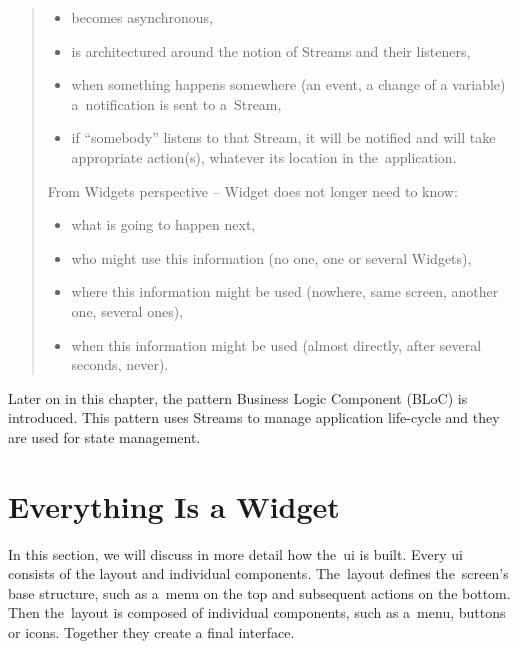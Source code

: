 \begin{quote}
    \begin{itemize}
        \item becomes asynchronous,
        \item is architectured around the notion of Streams and their listeners,
        \item when something happens somewhere (an event, a change of a variable) a~notification is sent to a~Stream,
        \item if ``somebody'' listens to that Stream, it will be notified and will take appropriate action(s), whatever its location in the~application.
    \end{itemize}
    
    From Widgets perspective -- Widget does not longer need to know:
    
    \begin{itemize}
        \item what is going to happen next,
        \item who might use this information (no one, one or several Widgets),
        \item where this information might be used (nowhere, same screen, another one, several ones),
        \item when this information might be used (almost directly, after several seconds, never).
    \end{itemize}
\end{quote}

Later on in this chapter, the pattern Business Logic Component (BLoC) is introduced. This pattern uses Streams to manage application life-cycle and they are used for state management.
\section{Everything Is a Widget}
In this section, we will discuss in more detail how the~\gls{ui} is built. Every \gls{ui} consists of the layout and individual components. The~layout defines the~screen's base structure, such as a~menu on the top and subsequent actions on the bottom. Then the~layout is composed of individual components, such as a~menu, buttons or icons. Together they create a final interface.

